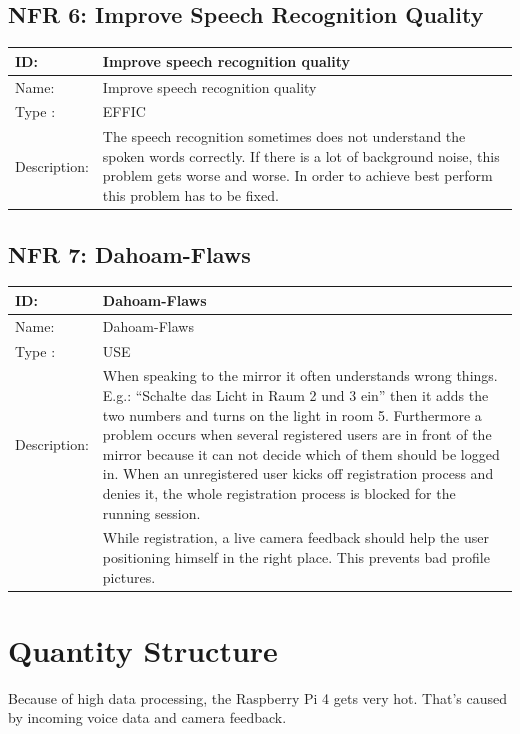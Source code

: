 \documentclass[12pt]{article}
\theoremstyle{definition}
\begin{document}
\subsection{NFR 6: Improve Speech Recognition Quality}
\begin{tabular}{|p{.2\linewidth}|p{.65\linewidth}|}
\hline 
ID: & Improve speech recognition quality \\ \hline
Name: & Improve speech recognition quality \\ \hline
Type	: & EFFIC\\ \hline
Description: & The speech recognition sometimes does not understand the spoken words correctly. If there is a lot of background noise, this problem gets worse and worse. In order to achieve best perform this problem has to be fixed.\\ \hline
\end{tabular}

\subsection{NFR 7: Dahoam-Flaws}
\begin{tabular}{|p{.2\linewidth}|p{.65\linewidth}|}
\hline 
ID: & Dahoam-Flaws \\ \hline
Name: & Dahoam-Flaws \\ \hline
Type	: & USE\\ \hline
Description: & When speaking to the mirror it often understands wrong things. E.g.: ``Schalte das Licht in Raum 2 und 3 ein'' then it adds the two numbers and turns on the light in room 5. Furthermore a problem occurs when several registered users are in front of the mirror because it can not decide which of them should be logged in. When an unregistered user kicks off registration process and denies it, the whole registration process is blocked for the running session.\\ & 
While registration, a live camera feedback should help the user positioning himself in the right place. This prevents bad profile pictures.
\\ \hline
\end{tabular}


\pagebreak

\section{Quantity Structure}

Because of high data processing, the Raspberry Pi 4 gets very hot. That's caused by incoming voice data and camera feedback.
\end{document}
